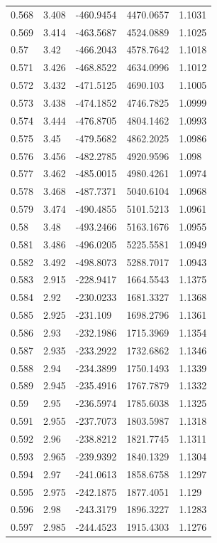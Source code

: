 \begin{tabular}{lllll}
0.568 & 3.408 & -460.9454 & 4470.0657 & 1.1031 \\
0.569 & 3.414 & -463.5687 & 4524.0889 & 1.1025 \\
0.57 & 3.42 & -466.2043 & 4578.7642 & 1.1018 \\
0.571 & 3.426 & -468.8522 & 4634.0996 & 1.1012 \\
0.572 & 3.432 & -471.5125 & 4690.103 & 1.1005 \\
0.573 & 3.438 & -474.1852 & 4746.7825 & 1.0999 \\
0.574 & 3.444 & -476.8705 & 4804.1462 & 1.0993 \\
0.575 & 3.45 & -479.5682 & 4862.2025 & 1.0986 \\
0.576 & 3.456 & -482.2785 & 4920.9596 & 1.098 \\
0.577 & 3.462 & -485.0015 & 4980.4261 & 1.0974 \\
0.578 & 3.468 & -487.7371 & 5040.6104 & 1.0968 \\
0.579 & 3.474 & -490.4855 & 5101.5213 & 1.0961 \\
0.58 & 3.48 & -493.2466 & 5163.1676 & 1.0955 \\
0.581 & 3.486 & -496.0205 & 5225.5581 & 1.0949 \\
0.582 & 3.492 & -498.8073 & 5288.7017 & 1.0943 \\
0.583 & 2.915 & -228.9417 & 1664.5543 & 1.1375 \\
0.584 & 2.92 & -230.0233 & 1681.3327 & 1.1368 \\
0.585 & 2.925 & -231.109 & 1698.2796 & 1.1361 \\
0.586 & 2.93 & -232.1986 & 1715.3969 & 1.1354 \\
0.587 & 2.935 & -233.2922 & 1732.6862 & 1.1346 \\
0.588 & 2.94 & -234.3899 & 1750.1493 & 1.1339 \\
0.589 & 2.945 & -235.4916 & 1767.7879 & 1.1332 \\
0.59 & 2.95 & -236.5974 & 1785.6038 & 1.1325 \\
0.591 & 2.955 & -237.7073 & 1803.5987 & 1.1318 \\
0.592 & 2.96 & -238.8212 & 1821.7745 & 1.1311 \\
0.593 & 2.965 & -239.9392 & 1840.1329 & 1.1304 \\
0.594 & 2.97 & -241.0613 & 1858.6758 & 1.1297 \\
0.595 & 2.975 & -242.1875 & 1877.4051 & 1.129 \\
0.596 & 2.98 & -243.3179 & 1896.3227 & 1.1283 \\
0.597 & 2.985 & -244.4523 & 1915.4303 & 1.1276 \\

\end{tabular}
